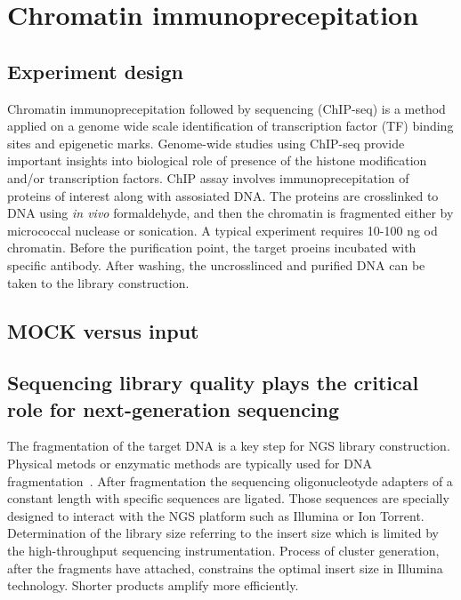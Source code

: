 \chapter{Chromatin immunoprecepitation}
\section{Experiment design}
Chromatin immunoprecepitation followed by sequencing (ChIP-seq) is a method applied on a genome wide scale identification of transcription factor (TF) binding sites and epigenetic marks.
Genome-wide studies using ChIP-seq provide important insights into biological role of presence of the histone modification and/or transcription factors.
ChIP assay involves immunoprecepitation of proteins of interest along with assosiated DNA.
The proteins are crosslinked to DNA using  \emph{in vivo} formaldehyde, and then the chromatin is fragmented either by micrococcal nuclease or sonication.
A typical experiment requires 10-100 ng od chromatin.
Before the purification point, the target proeins incubated with specific antibody.
After washing, the uncrosslinced and purified DNA can be taken to the library construction.

\section{MOCK versus input}


\section{Sequencing library quality plays the critical role for next-generation sequencing}
The fragmentation of the target DNA is a key step for NGS library construction.
Physical metods or enzymatic methods are typically used for DNA fragmentation~\cite{}.
After fragmentation the sequencing oligonucleotyde adapters of a constant length with specific sequences are ligated.
Those sequences are specially designed to interact with the NGS platform such as Illumina or Ion Torrent.
Determination of the library size referring to the insert size which is limited by the high-throughput sequencing instrumentation.
Process of cluster generation, after the fragments have attached, constrains the optimal insert size in Illumina technology.
Shorter products amplify more efficiently.

